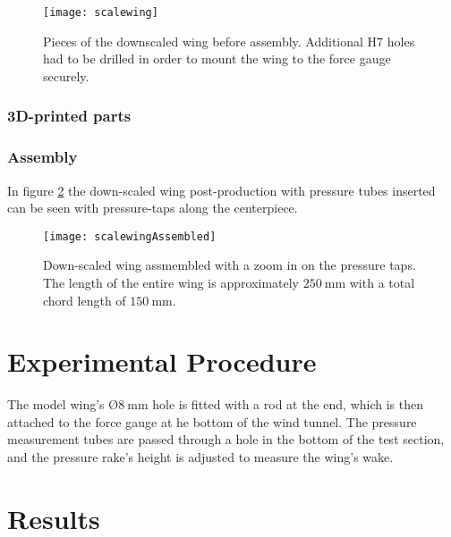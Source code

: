         \begin{figure}
          \texttt{[image: scalewing]}
          \caption{Pieces of the downscaled wing before assembly. Additional H7 holes had to be drilled in order to mount the wing to the force gauge securely.}
          \label{fig:scalewingparts}
        \end{figure}

      \subsubsection{3D-printed parts}
      \subsubsection{Assembly}

      In figure \ref{fig:scalewing} the down-scaled wing post-production with pressure tubes inserted can be seen with pressure-taps along the centerpiece.

      \begin{figure}
        \texttt{[image: scalewingAssembled]}
        \caption{Down-scaled wing assmembled with a zoom in on the pressure taps. The length of the entire wing is approximately $\SI{250}{\milli\metre}$ with a total chord length of $\SI{150}{\milli\metre}$.}
        \label{fig:scalewing}
      \end{figure}

\section{Experimental Procedure}

  The model wing's $Ø\SI{8}{\milli\metre}$ hole is fitted with a rod at the end, which is then attached to the force gauge at he bottom of the wind tunnel. The pressure measurement tubes are passed through a hole in the bottom of the test section, and the pressure rake's height is adjusted to measure the wing's wake.

\section{Results}
